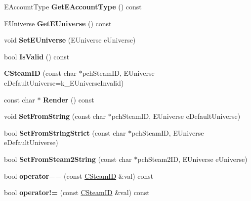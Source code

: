 \begin{DoxyCompactItemize}
E\+Account\+Type {\bfseries Get\+E\+Account\+Type} () const
\item 
\mbox{\label{class_c_steam_i_d_a2b784380c7060266164d43dc028a0f86}} 
E\+Universe {\bfseries Get\+E\+Universe} () const
\item 
\mbox{\label{class_c_steam_i_d_a8cde52a2039167bdf27bb250b4a6bf0b}} 
void {\bfseries Set\+E\+Universe} (E\+Universe e\+Universe)
\item 
\mbox{\label{class_c_steam_i_d_ac69aac831ab818d1575859c3cf995e4f}} 
bool {\bfseries Is\+Valid} () const
\item 
\mbox{\label{class_c_steam_i_d_a6bbdb7c51fa76f795404d7ebb33c1732}} 
{\bfseries C\+Steam\+ID} (const char $\ast$pch\+Steam\+ID, E\+Universe e\+Default\+Universe=k\+\_\+\+E\+Universe\+Invalid)
\item 
\mbox{\label{class_c_steam_i_d_af814bb71d845c1dddb1720a9a77f581d}} 
const char $\ast$ {\bfseries Render} () const
\item 
\mbox{\label{class_c_steam_i_d_a27556e1b84489fd80cb5dafa2048a6bb}} 
void {\bfseries Set\+From\+String} (const char $\ast$pch\+Steam\+ID, E\+Universe e\+Default\+Universe)
\item 
\mbox{\label{class_c_steam_i_d_a4149d7cf64072a585c9ef201bbf88f0f}} 
bool {\bfseries Set\+From\+String\+Strict} (const char $\ast$pch\+Steam\+ID, E\+Universe e\+Default\+Universe)
\item 
\mbox{\label{class_c_steam_i_d_af28dc382ff4cafc37c1b277f8e421dd3}} 
bool {\bfseries Set\+From\+Steam2\+String} (const char $\ast$pch\+Steam2\+ID, E\+Universe e\+Universe)
\item 
\mbox{\label{class_c_steam_i_d_a07e1e51fab05038a6d91a75613f114ad}} 
bool {\bfseries operator==} (const \hyperlink{class_c_steam_i_d}{C\+Steam\+ID} \&val) const
\item 
\mbox{\label{class_c_steam_i_d_aa118771571ca5083aa5a1aebc6fbeac3}} 
bool {\bfseries operator!=} (const \hyperlink{class_c_steam_i_d}{C\+Steam\+ID} \&val) const

\end{DoxyCompactItemize}

